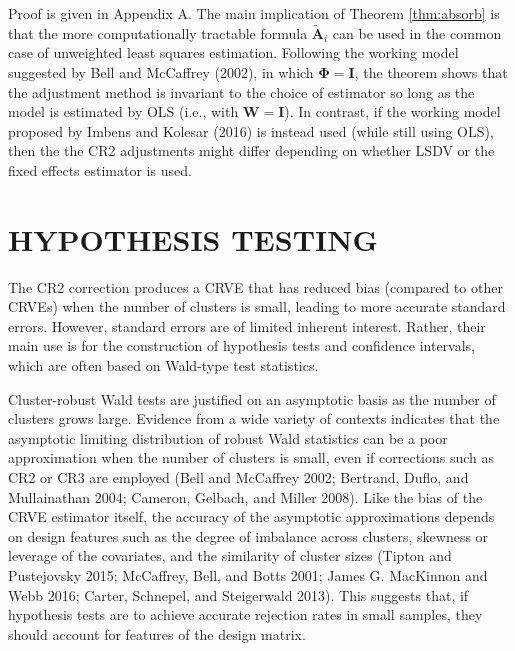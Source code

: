 \documentclass[12pt]{article}
\begin{document}
Proof is given in Appendix A. The main implication of Theorem
\ref{thm:absorb} is that the more computationally tractable formula
\(\mathbf{\tilde{A}}_i\) can be used in the common case of unweighted
least squares estimation. Following the working model suggested by Bell
and McCaffrey (2002), in which \(\boldsymbol\Phi = \mathbf{I}\), the
theorem shows that the adjustment method is invariant to the choice of
estimator so long as the model is estimated by OLS (i.e., with
\(\mathbf{W} = \mathbf{I}\)). In contrast, if the working model proposed
by Imbens and Kolesar (2016) is instead used (while still using OLS),
then the the CR2 adjustments might differ depending on whether LSDV or
the fixed effects estimator is used.

\hypertarget{sec:testing}{%
\section{HYPOTHESIS TESTING}\label{sec:testing}}

The CR2 correction produces a CRVE that has reduced bias (compared to
other CRVEs) when the number of clusters is small, leading to more
accurate standard errors. However, standard errors are of limited
inherent interest. Rather, their main use is for the construction of
hypothesis tests and confidence intervals, which are often based on
Wald-type test statistics.

Cluster-robust Wald tests are justified on an asymptotic basis as the
number of clusters grows large. Evidence from a wide variety of contexts
indicates that the asymptotic limiting distribution of robust Wald
statistics can be a poor approximation when the number of clusters is
small, even if corrections such as CR2 or CR3 are employed (Bell and
McCaffrey 2002; Bertrand, Duflo, and Mullainathan 2004; Cameron,
Gelbach, and Miller 2008). Like the bias of the CRVE estimator itself,
the accuracy of the asymptotic approximations depends on design features
such as the degree of imbalance across clusters, skewness or leverage of
the covariates, and the similarity of cluster sizes (Tipton and
Pustejovsky 2015; McCaffrey, Bell, and Botts 2001; James G. MacKinnon
and Webb 2016; Carter, Schnepel, and Steigerwald 2013). This suggests
that, if hypothesis tests are to achieve accurate rejection rates in
small samples, they should account for features of the design matrix.
\end{document}
